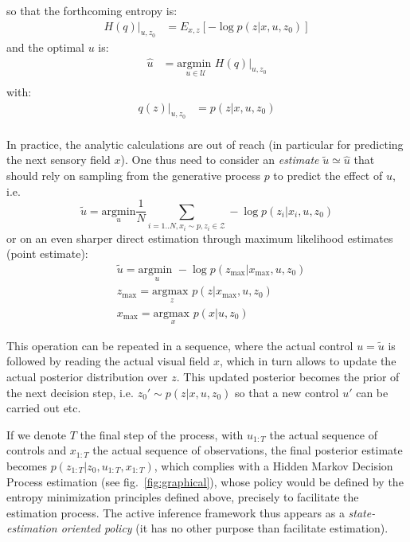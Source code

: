 \documentclass{article} %
\begin{document}
	
	so that the forthcoming entropy is:
	\begin{align*}
	H(q)|_{u, z_0} &=  E_{x,z}\left[-\log  p(z|x,u,z_0)\right]
	\end{align*}
	and the optimal $u$ is:
	\begin{align*}
	\hat{u} &= \underset{u \in \mathcal{U}}{\text{argmin }} H(q)|_{u, z_0} \\
	\end{align*}
	with:
	\begin{align*}
	q(z)|_{u,z_0} &= p(z|x,u,z_0) \\
	\end{align*}
	
	In practice, the analytic calculations are out of reach (in particular for predicting the next sensory field $x$).  One thus need to consider an \emph{estimate} $\tilde{u} \simeq \hat{u}$ that should rely on sampling from the generative process $p$ to 
	predict the effect of $u$,  i.e. 
	$$ \tilde{u} = \underset{u}{\text{argmin}} \frac{1}{N} \sum_{i = 1..N, x_i \sim p, z_i \in \mathcal{Z}} -\log p(z_i| x_i, u, z_0) $$ or on an even sharper direct estimation through maximum likelihood estimates (point estimate):
	\begin{align*}
	&\tilde{u} = \underset{u}{\text{argmin }} - \log p(z_\text{max}|x_\text{max}, u, z_0)	\\
	&z_\text{max} = \underset{z}{\text{argmax }} p(z|x_\text{max}, u, z_0)\\
	&x_\text{max} = \underset{x}{\text{argmax }} p(x|u,z_0)
	\end{align*}


This operation can be repeated in a sequence, where the actual control $u = \tilde{u}$ is followed by reading the actual visual field $x$, which in turn allows to update the actual posterior distribution over $z$. This updated posterior becomes the prior of the next decision step, i.e. $z_0'\sim  p(z|x, u, z_0)$ so that a new control $u'$ can be carried out etc. 

If we denote $T$ the final step of the process,  with $u_{1:T}$ the actual sequence of controls and $x_{1:T}$ the actual sequence of observations, the final posterior estimate becomes $p(z_{1:T}|z_0, u_{1:T}, x_{1:T})$, which complies with a Hidden Markov Decision Process estimation (see fig.~\ref{fig:graphical}), whose policy would be defined by the entropy minimization principles defined above, precisely to facilitate the estimation process. The active inference framework thus appears  as a \emph{state-estimation oriented policy} (it has no other purpose than facilitate estimation).
\end{document}
